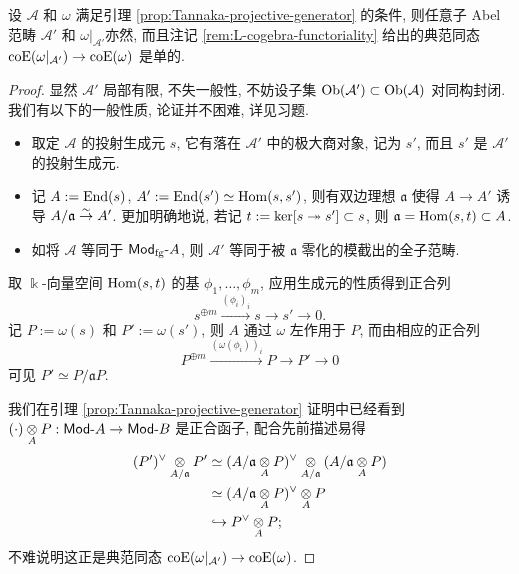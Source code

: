 \begin{lemma}\label{prop:subcat-gen-L}
	设 $\mathcal{A}$ 和 $\omega$ 满足引理 \ref{prop:Tannaka-projective-generator} 的条件, 则任意子 Abel 范畴 $\mathcal{A}'$ 和 $\omega|_{\mathcal{A}'}$亦然, 而且注记 \ref{rem:L-cogebra-functoriality} 给出的典范同态 $\operatorname{coE}(\omega|_{\mathcal{A}'}) \to \operatorname{coE}(\omega)$ 是单的.
\end{lemma}
\begin{proof}
	显然 $\mathcal{A}'$ 局部有限, 不失一般性, 不妨设子集 $\operatorname{Ob}(\mathcal{A}') \subset \operatorname{Ob}(\mathcal{A})$ 对同构封闭. 我们有以下的一般性质, 论证并不困难, 详见习题.
	\begin{itemize}
		\item 取定 $\mathcal{A}$ 的投射生成元 $s$, 它有落在 $\mathcal{A}'$ 中的极大商对象, 记为 $s'$, 而且 $s'$ 是 $\mathcal{A}'$ 的投射生成元.
		\item  记 $A := \operatorname{End}(s)$, $A' := \operatorname{End}(s') \simeq \operatorname{Hom}(s, s')$, 则有双边理想 $\mathfrak{a}$ 使得 $A \to A'$ 诱导 $A/\mathfrak{a} \stackrel{\sim}{\rightarrow} A'$. 更加明确地说, 若记 $t := \operatorname{ker}[s \twoheadrightarrow s'] \subset s$, 则 $\mathfrak{a} = \operatorname{Hom}(s, t) \subset A$.
		\item 如将 $\mathcal{A}$ 等同于 $\mathsf{Mod}_{\mathrm{fg}}\text{-}A$, 则 $\mathcal{A}'$ 等同于被 $\mathfrak{a}$ 零化的模截出的全子范畴.
	\end{itemize}

	取 $\Bbbk$-向量空间 $\operatorname{Hom}(s, t)$ 的基 $\phi_1, \ldots, \phi_m$, 应用生成元的性质得到正合列
	\[ s^{\oplus m} \xrightarrow{(\phi_i)_i} s \to s' \to 0. \]
	记 $P := \omega(s)$ 和 $P' := \omega(s')$, 则 $A$ 通过 $\omega$ 左作用于 $P$, 而由相应的正合列
	\[ P^{\oplus m} \xrightarrow{(\omega(\phi_i))_i} P \to P' \to 0 \]
	可见 $P' \simeq P/\mathfrak{a}P$.
	
	我们在引理 \ref{prop:Tannaka-projective-generator} 证明中已经看到 $(\cdot) \underset{A}{\otimes} P: \mathsf{Mod}\text{-}A \to \mathsf{Mod}\text{-}B$ 是正合函子, 配合先前描述易得
	\begin{align*}
		(P')^\vee \underset{A/\mathfrak{a}}{\otimes} P' & \simeq (A/\mathfrak{a} \underset{A}{\otimes} P)^\vee \underset{A/\mathfrak{a}}{\otimes} ( A/\mathfrak{a} \underset{A}{\otimes} P) \\
		& \simeq (A/\mathfrak{a} \underset{A}{\otimes} P)^\vee \underset{A}{\otimes} P
		\\
		& \hookrightarrow P^\vee \underset{A}{\otimes} P;
	\end{align*}
	不难说明这正是典范同态 $\operatorname{coE}(\omega|_{\mathcal{A}'}) \to \operatorname{coE}(\omega)$.
\end{proof}

